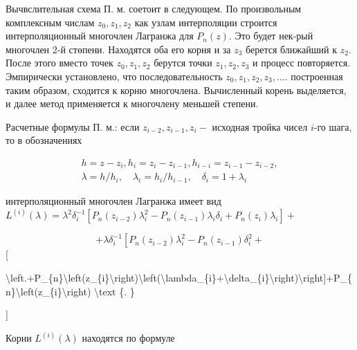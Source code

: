 \documentclass[10pt]{article}
\begin{document}
Вычвслительная схема П. м. соетоит в следующем. По произвольным комплексным числам $z_{0}, z_{1}, z_{2}$ как узлам интерполяции строится интерполяционный многочлен Лагранжа для $P_{n}(z)$. Это будет нек-рый многочлен 2-й стөпени. Находятся оба его корня и за $z_{3}$ берется ближайший к $z_{2}$. После этого вместо точек $z_{0}, z_{1}, z_{2}$ берутся точки $z_{1}, z_{2}, z_{3}$ и процесс повторяется. Эмпирически установлено, что последовательность $z_{0}, z_{1}, z_{2}, z_{3}, \ldots$. построенная таким образом, сходится к корню многочлена. Вычисленный корень выделяется, и далее метод применяется к многочлену меньшей степени.



Расчетные формулы П. м.: если $z_{i-2}, z_{i-1}, z_{i}-$ исходная тройка чисел $i$-го шага, то в обозначениях



\[

\begin{gathered}

h=z-z_{i}, h_{i}=z_{i}-z_{i-1}, h_{i-i}=z_{i-1}-z_{i-2}, \\

\lambda=h / h_{i}, \quad \lambda_{i}=h_{i} / h_{i-1}, \quad \delta_{i}=1+\lambda_{i}

\end{gathered}

\]



интерполяционный многочлен Лагранжа имеет вид $L^{(i)}(\lambda)=\lambda^{2} \delta_{i}^{-1}\left[P_{n}\left(z_{i-2}\right) \lambda_{i}^{2}-P_{n}\left(z_{i-1}\right) \lambda_{i} \delta_{i}+P_{n}\left(z_{i}\right) \lambda_{i}\right]+$



\[

+\lambda \delta_{i}^{-1}\left[P_{n}\left(z_{i-2}\right) \lambda_{i}^{2}-P_{n}\left(z_{i-1}\right) \delta_{i}^{2}+\right.

\][



\textbackslash left.+P\_\{n\}\textbackslash left(z\_\{i\}\textbackslash right)\textbackslash left(\textbackslash lambda\_\{i\}+\textbackslash delta\_\{i\}\textbackslash right)\textbackslash right]+P\_\{n\}\textbackslash left(z\_\{i\}\textbackslash right) \textbackslash text \{. \}

]



Корни $L^{(i)}(\lambda)$ находятся по формуле
\end{document}
